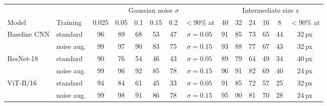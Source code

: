 \begin{tabular}{llcccccccccccc}
\toprule
 & & \multicolumn{6}{c}{Gaussian noise $\sigma$} & \multicolumn{6}{c}{Intermediate size $s$} \\
\cmidrule(lr){3-8}\cmidrule(lr){9-14}
Model & Training & 0.025 & 0.05 & 0.1 & 0.15 & 0.2 & $<$90\% at & 40 & 32 & 24 & 16 & 8 & $<$90\% at \\
\midrule
Baseline CNN & standard & 96 & 89 & 68 & 53 & 47 & $\sigma{=}0.05$ & 91 & 85 & 73 & 65 & 44 & 32\,px \\
 & noise aug. & 99 & 97 & 90 & 83 & 75 & $\sigma{=}0.15$ & 93 & 88 & 77 & 67 & 43 & 32\,px \\
\addlinespace
ResNet-18 & standard & 90 & 76 & 54 & 46 & 43 & $\sigma{=}0.05$ & 89 & 79 & 64 & 49 & 34 & 40\,px \\
 & noise aug. & 99 & 96 & 92 & 85 & 78 & $\sigma{=}0.15$ & 96 & 91 & 82 & 69 & 40 & 24\,px \\
\addlinespace
ViT-B/16 & standard & 94 & 84 & 61 & 45 & 33 & $\sigma{=}0.05$ & 91 & 85 & 72 & 57 & 25 & 32\,px \\
 & noise aug. & 99 & 98 & 91 & 86 & 78 & $\sigma{=}0.15$ & 95 & 90 & 81 & 70 & 28 & 24\,px \\
\bottomrule
\end{tabular}
